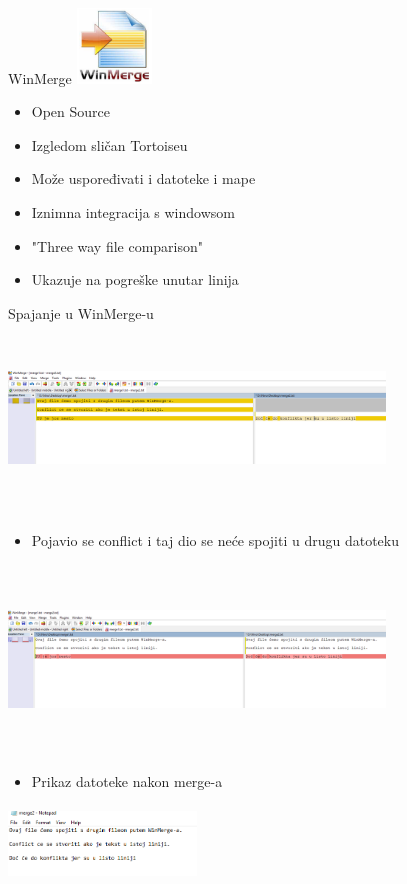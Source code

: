 \documentclass[10pt]{beamer}
\begin{document}
\begin{frame}{WinMerge}
\includegraphics[width=2cm, height=2cm]{WinMerge1.png}
\begin{itemize}
    \item Open Source
    \item Izgledom sličan Tortoiseu
    \item Može uspoređivati i datoteke i mape
    \item Iznimna integracija s windowsom
    \item "Three way file comparison"
    \item Ukazuje na pogreške unutar linija
\end{itemize}
    
\end{frame}
\begin{frame}{Spajanje u WinMerge-u}
\includegraphics[width=10cm, height=5cm]{WinMerge2.png}
    
\end{frame}
\begin{frame}
    \begin{itemize}
        \item Pojavio se conflict i taj dio se neće spojiti u drugu datoteku
    \end{itemize}
    \includegraphics[width=10cm, height=5cm]{WinMerge3.png}\newline
    \begin{itemize}
        \item Prikaz datoteke nakon merge-a
    \end{itemize}
    \includegraphics[width=5cm, height=2cm]{WinMerge4.png}
\end{frame}
\end{document}
